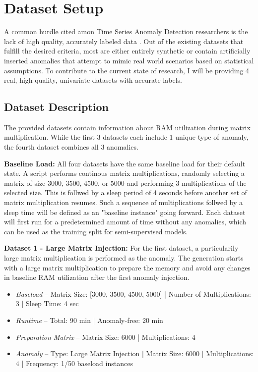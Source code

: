 \documentclass[12pt,oneside]{article}
\begin{document}
\section{Dataset Setup}
A common hurdle cited amon Time Series Anomaly Detection researchers is the lack of high quality, accurately labeled data \parencites[p.~2]{liu2024elephant}[p.~1-6]{wu2021current}[p.~1]{paparrizos2022tsb}. Out of the existing datasets that fulfill the desired criteria, most are either entirely synthetic or contain artificially inserted anomalies that attempt to mimic real world scenarios based on statistical assumptions. To contribute to the current state of research, I will be providing 4 real, high quality, univariate datasets with accurate labels. 

\subsection{Dataset Description}
The provided datasets contain information about RAM utilization during matrix multiplication. While the first 3 datasets each include 1 unique type of anomaly, the fourth dataset combines all 3 anomalies. \par

\textbf{Baseline Load:} All four datasets have the same baseline load for their default state. A script performs continous matrix multiplications, randomly selecting a matrix of size 3000, 3500, 4500, or 5000 and performing 3 multiplications of the selected size. This is follwed by a sleep period of 4 seconds before another set of matrix multiplication resumes. Such a sequence of multiplications follwed by a sleep time will be defined as an "baseline instance" going forward. Each dataset will first run for a predetermined amount of time without any anomalies, which can be used as the training split for semi-supervised models.

\textbf{Dataset 1 - Large Matrix Injection:} For the first dataset, a particularily large matrix multiplication is performed as the anomaly. The generation starts with a large matrix multiplication to prepare the memory and avoid any changes in baseline RAM utilization after the first anomaly injection. 
\begin{itemize}
    \item \textit{Baseload} -- Matrix Size: [3000, 3500, 4500, 5000] | Number of Multiplications: 3 | Sleep Time: 4 sec
    \item \textit{Runtime} -- Total: 90 min | Anomaly-free: 20 min 
    \item \textit{Preparation Matrix} -- Matrix Size: 6000 | Multiplications: 4
    \item \textit{Anomaly} -- Type: Large Matrix Injection | Matrix Size: 6000 | Multiplications: 4 | Frequency: 1/50 baseload instances
\end{itemize}
\end{document}
